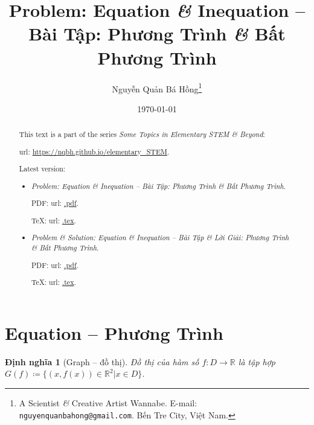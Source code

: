 \documentclass{article}
\title{Problem: Equation {\it\&} Inequation -- Bài Tập: Phương Trình {\it\&} Bất Phương Trình}
\author{Nguyễn Quản Bá Hồng\footnote{A Scientist {\it\&} Creative Artist Wannabe. E-mail: {\tt nguyenquanbahong@gmail.com}. Bến Tre City, Việt Nam.}}
\date{\today}
\newtheorem{dinhnghia}{Định nghĩa}
\begin{document}
\maketitle
\begin{abstract}
	This text is a part of the series {\it Some Topics in Elementary STEM \& Beyond}:
	
	{\sc url}: \url{https://nqbh.github.io/elementary_STEM}.
	
	Latest version:
	\begin{itemize}
		\item {\it Problem: Equation \& Inequation -- Bài Tập: Phương Trình \& Bất Phương Trình}.
		
		PDF: {\sc url}: \url{.pdf}.
		
		\TeX: {\sc url}: \url{.tex}.
		\item {\it Problem \& Solution: Equation \& Inequation -- Bài Tập \& Lời Giải: Phương Trình \& Bất Phương Trình}.
		
		PDF: {\sc url}: \url{.pdf}.
		
		\TeX: {\sc url}: \url{.tex}.
	\end{itemize}
\end{abstract}
\tableofcontents


\section{Equation -- Phương Trình}

\begin{dinhnghia}[Graph -- đồ thị]
	{\rm Đồ thị} của hàm số $f:D\to\mathbb{R}$ là tập hợp $G(f)\coloneqq\{(x,f(x))\in\mathbb{R}^2|x\in D\}$.
\end{dinhnghia}
\end{document}
